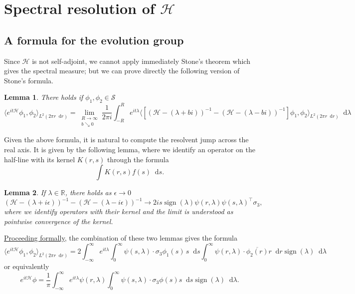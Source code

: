 \documentclass[11 pt]{amsart}
\newtheorem{lem}{Lemma}[section]
\theoremstyle{definition}
\theoremstyle{remark}
\numberwithin{equation}{section}
\newcommand{\dd}{\mathop{}\!\mathrm{d}}
\begin{document}
\section{Spectral resolution of $\mathcal{H}$}

\label{sectionspectral}


\subsection{A formula for the evolution group} \label{subsec:evolution-group}

Since $\mathcal{H}$ is not self-adjoint, we cannot apply immediately Stone's theorem which gives the spectral measure; but we can prove directly the following version of Stone's formula.

\begin{lem} \label{lem:semi-group:intermediate-result} There holds if $\phi_1,\phi_2 \in \mathcal{S}$
$$
 \langle e^{it\mathcal{H}} \phi_1 , \phi_2 \rangle_{L^2(2\pi r \dd r)} = \lim_{\substack{R \to \infty \\ b \searrow 0}} \frac{1}{2\pi i} \int_{-R}^R e^{it\lambda} \langle \left[  (\mathcal{H} - (\lambda+b i))^{-1} -  (\mathcal{H} - (\lambda - b i))^{-1}  \right] \phi_1,\phi_2 \rangle_{L^2(2\pi r \dd r)} \dd \lambda
$$
\end{lem}

Given the above formula, it is natural to compute the resolvent jump across the real axis. It is given by the following lemma, where we identify an operator on the half-line with its kernel $K(r,s)$ through the formula
$$
\int K(r,s) f(s) \dd s.
$$

\begin{lem} \label{propjump}
If $\lambda \in \mathbb{R}$, there holds as $\epsilon \to 0$
$$
(\mathcal{H}- (\lambda + i\epsilon))^{-1} - (\mathcal{H}- (\lambda - i\epsilon))^{-1}
\longrightarrow 2 i s \operatorname{sign}(\lambda)  \psi(r,\lambda) \psi(s,\lambda)^\top \sigma_3,
$$
where we identify operators with their kernel and the limit is understood as pointwise convergence of the kernel.
\end{lem}

\underline{Proceeding formally}, the combination of these two lemmas gives the formula
$$
\langle e^{it \mathcal{H}} \phi_1 , \phi_2 \rangle_{L^2(2\pi r \dd r)}
= 2 \int_{-\infty}^\infty e^{it\lambda}  \int_0^\infty \psi(s,\lambda) \cdot \sigma_3 \phi_1(s) \, s \dd s \int_0^\infty \psi(r,\lambda) \cdot \overline{\phi_2(r)} r \dd r \operatorname{sign} (\lambda) \dd \lambda
$$
or equivalently
\begin{equation}
\label{hibou}
e^{it \mathcal{H}} \phi = \frac{1}{\pi } \int_{-\infty}^\infty  e^{it\lambda} \psi(r,\lambda) \int_0^\infty \psi(s,\lambda) \cdot \sigma_3 \phi(s) s \dd s \operatorname{sign} (\lambda) \dd \lambda.
\end{equation}
\end{document}
